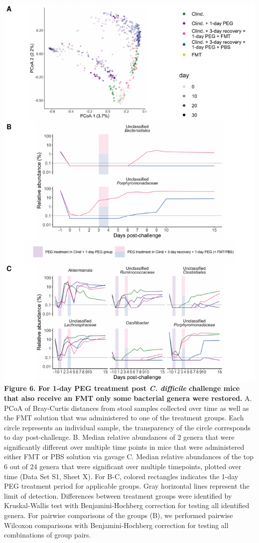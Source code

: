 \documentclass[
  11pt,
]{article}
\begin{document}
\includegraphics{figure_6.pdf} \textbf{Figure 6. For 1-day PEG treatment
post \emph{C. difficile} challenge mice that also receive an FMT only
some bacterial genera were restored.} A. PCoA of Bray-Curtis distances
from stool samples collected over time as well as the FMT solution that
was administered to one of the treatment groups. Each circle represents
an individual sample, the transparency of the circle corresponds to day
post-challenge. B. Median relative abundances of 2 genera that were
significantly different over multiple time points in mice that were
administered either FMT or PBS solution via gavage C. Median relative
abundances of the top 6 out of 24 genera that were significant over
multiple timepoints, plotted over time (Data Set S1, Sheet X). For B-C,
colored rectangles indicates the 1-day PEG treatment period for
applicable groups. Gray horizontal lines represent the limit of
detection. Differences between treatment groups were identified by
Kruskal-Wallis test with Benjamini-Hochberg correction for testing all
identified genera. For pairwise comparisons of the groups (B), we
performed pairwise Wilcoxon comparisons with Benjamini-Hochberg
correction for testing all combinations of group pairs.
\end{document}
